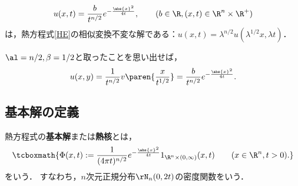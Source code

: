 \documentclass[uplatex,dvipdfmx]{jsreport}
\begin{document}
\begin{proposition}[相似変換不変な解の発見]\label{prop-fundamental-solution-of-HE-is-a-solution}
    \[u(x,t)=\frac{b}{t^{n/2}}e^{-\frac{\abs{x}^2}{4t}},\qquad(b\in\R,(x,t)\in\R^n\times\R^+)\]
    は，熱方程式\ref{HE}の相似変換不変な解である：$u(x,t)=\lambda^{n/2} u(\lambda^{1/2} x,\lambda t)$．
\end{proposition}
\begin{Proof}
    $\al=n/2,\beta=1/2$と取ったことを思い出せば，
    \[u(x,y)=\frac{1}{t^{n/2}}v\paren{\frac{x}{t^{1/2}}}=\frac{b}{t^{n/2}}e^{-\frac{\abs{x}^2}{4t}}.\]
\end{Proof}

\subsection{基本解の定義}

\begin{tcolorbox}[colframe=ForestGreen, colback=ForestGreen!10!white,breakable,colbacktitle=ForestGreen!40!white,coltitle=black,fonttitle=\bfseries\sffamily,
title=]
    \begin{definition}
        熱方程式の\textbf{基本解}または\textbf{熱核}とは，
        \[\tcboxmath{\Phi(x,t):=\frac{1}{(4\pi t)^{n/2}}e^{-\frac{\abs{x}^2}{4t}}1_{\R^n\times(0,\infty)}(x,t)\qquad(x\in\R^n,t>0).}\]
        をいう．
        すなわち，$n$次元正規分布$\rN_n(0,2t)$の密度関数をいう．
    \end{definition}
\end{tcolorbox}
\end{document}
